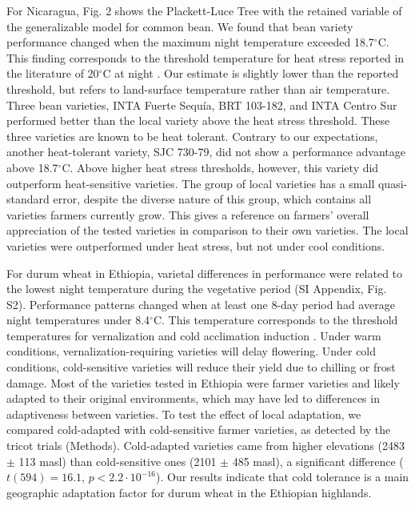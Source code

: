 \documentclass[9pt,twocolumn,twoside]{pnas-new}
\begin{document}
For Nicaragua, Fig. 2 shows the Plackett-Luce Tree with the retained variable of the generalizable model for common bean. We found that bean variety performance changed when the maximum night temperature exceeded 18.7$^{\circ}$C. 
This finding corresponds to the threshold temperature for heat stress reported in the literature of 20$^{\circ}$C at night \cite{rainey2005inheritance}. Our estimate is slightly lower than the reported threshold, but refers to land-surface temperature rather than air temperature. Three bean varieties, INTA Fuerte Sequía, BRT 103-182, and INTA Centro Sur performed better than the local variety above the heat stress threshold. These three varieties are known to be heat tolerant. Contrary to our expectations, another heat-tolerant variety, SJC 730-79, did not show a performance advantage above 18.7$^{\circ}$C. Above higher heat stress thresholds, however, this variety did outperform heat-sensitive varieties. The group of local varieties has a small quasi-standard error, despite the diverse nature of this group, which contains all varieties farmers currently grow. This gives a reference on farmers' overall appreciation of the tested varieties in comparison to their own varieties. The local varieties were outperformed under heat stress, but not under cool conditions. 

For durum wheat in Ethiopia, varietal differences in performance were related to the lowest night temperature during the vegetative period (SI Appendix, Fig. S2). Performance patterns changed when at least one 8-day period had average night temperatures under 8.4$^{\circ}$C. This temperature corresponds to the threshold temperatures for vernalization and cold acclimation induction \cite{fowler2008cold}. Under warm conditions, vernalization-requiring varieties will delay flowering. Under cold conditions, cold-sensitive varieties will reduce their yield due to chilling or frost damage. Most of the varieties tested in Ethiopia were farmer varieties and likely adapted to their original environments, which may have led to differences in adaptiveness between varieties. To test the effect of local adaptation, we compared cold-adapted with cold-sensitive farmer varieties, as detected by the tricot trials (Methods). Cold-adapted varieties came from higher elevations (2483 $\pm$ 113 masl) than cold-sensitive ones (2101 $\pm$ 485 masl), a significant difference ($t(594)=16.1$, $p<2.2 \cdot 10^{-16}$). Our results indicate that cold tolerance is a main geographic adaptation factor for durum wheat in the Ethiopian highlands.
\end{document}
